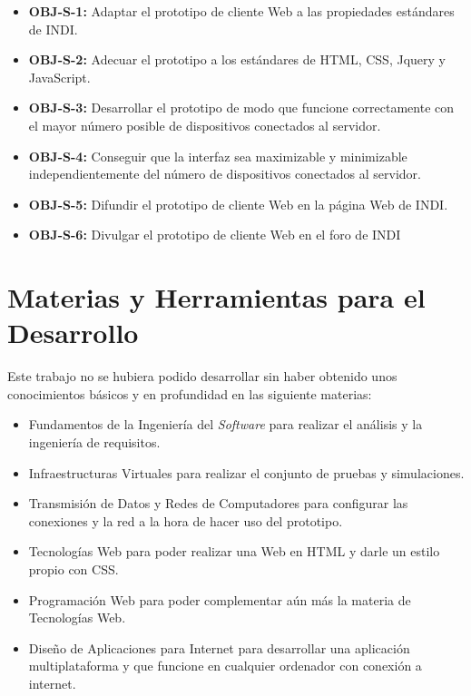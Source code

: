 \begin{itemize}
  \item \textbf{OBJ-S-1:} Adaptar el prototipo de cliente Web a las propiedades estándares de INDI.
  \item \textbf{OBJ-S-2:} Adecuar el prototipo a los estándares de HTML, CSS, Jquery y JavaScript.
  \item \textbf{OBJ-S-3:} Desarrollar el prototipo de modo que funcione correctamente con el mayor número posible de dispositivos conectados al servidor.
  \item \textbf{OBJ-S-4:} Conseguir que la interfaz sea maximizable y minimizable independientemente del número de dispositivos conectados al servidor.
  \item \textbf{OBJ-S-5:} Difundir el prototipo de cliente Web en la página Web de INDI.
  \item \textbf{OBJ-S-6:} Divulgar el prototipo de cliente Web en el foro de INDI
\end{itemize}


\section{Materias y Herramientas para el Desarrollo}
Este trabajo no se hubiera podido desarrollar sin haber obtenido unos conocimientos básicos y en profundidad en las siguiente materias:
\begin{itemize}
  \item Fundamentos de la Ingeniería del \textit{Software} para realizar el análisis y la ingeniería de requisitos.
  \item Infraestructuras Virtuales para realizar el conjunto de pruebas y simulaciones.
  \item Transmisión de Datos y Redes de Computadores para configurar las conexiones y la red a la hora de hacer uso del prototipo.
  \item Tecnologías Web para poder realizar una Web en HTML y darle un estilo propio con CSS.
  \item Programación Web para poder complementar aún más la materia de Tecnologías Web.
  \item Diseño de Aplicaciones para Internet para desarrollar una aplicación multiplataforma y que funcione en cualquier ordenador con conexión a internet.
\end{itemize}

